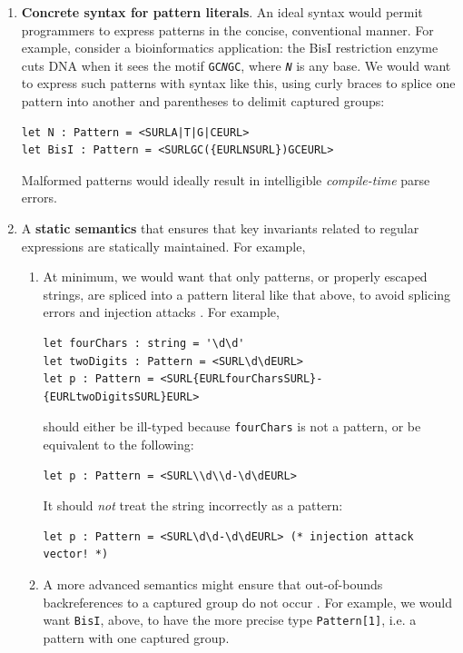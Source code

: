 \begin{enumerate}
\item \textbf{Concrete syntax for pattern literals}. An ideal syntax would permit programmers to express patterns in the concise, conventional manner. For example, consider a bioinformatics  application: the BisI restriction enzyme cuts DNA when it sees the motif \texttt{GC\textit{N}GC}, where \texttt{\textit{N}} is any base. We would want to express such patterns with syntax like this, using curly braces to splice one pattern into another and parentheses to delimit captured groups:
\begin{lstlisting}[numbers=none]
let N : Pattern = <SURLA|T|G|CEURL>
let BisI : Pattern = <SURLGC({EURLNSURL})GCEURL>\end{lstlisting}
Malformed patterns would ideally result in intelligible \emph{compile-time} parse errors.
\item A \textbf{static semantics} that ensures that key invariants related to regular expressions are statically maintained. For example, 
	\begin{enumerate}
	\item At minimum, we would want that only patterns, or properly escaped strings, are spliced into a pattern literal like that above, to avoid splicing errors and injection attacks \cite{owasp2013, Bravenboer:2007:PIA:1289971.1289975}. For example,
\begin{lstlisting}[numbers=none]
let fourChars : string = '\d\d'
let twoDigits : Pattern = <SURL\d\dEURL>
let p : Pattern = <SURL{EURLfourCharsSURL}-{EURLtwoDigitsSURL}EURL>
\end{lstlisting}
    should either be ill-typed because \lstinline{fourChars} is not a pattern, or be equivalent to the following:
\begin{lstlisting}[numbers=none]
let p : Pattern = <SURL\\d\\d-\d\dEURL>
\end{lstlisting}
    It should \emph{not} treat the string incorrectly as a pattern:
\begin{lstlisting}[numbers=none]
let p : Pattern = <SURL\d\d-\d\dEURL> (* injection attack vector! *)
\end{lstlisting}
	\item A more advanced semantics might ensure that out-of-bounds backreferences to a captured group do not occur \cite{spishak2012type}. For example, we would want \verb|BisI|, above, to have the more precise type \verb|Pattern[1]|, i.e. a pattern with one captured group. 

\end{enumerate}
\end{enumerate}
